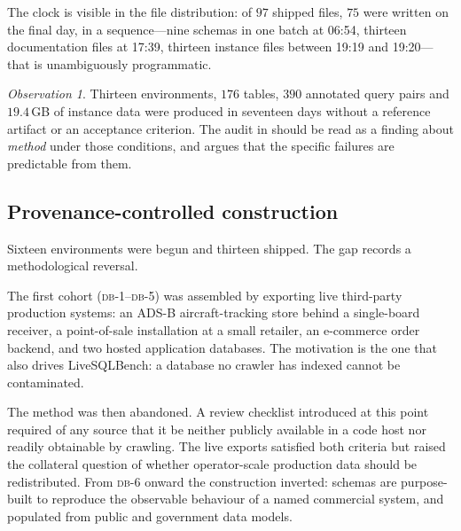 \documentclass[11pt,letterpaper]{article}
\theoremstyle{definition}
\theoremstyle{plain}
\theoremstyle{remark}
\newtheorem{observation}{Observation}
\newcommand{\dbn}[1]{\textsc{db-#1}}
\begin{document}
The clock is visible in the file distribution: of $97$ shipped files, $75$ were written on the
final day, in a sequence---nine schemas in one batch at 06:54, thirteen documentation files at
17:39, thirteen instance files between 19:19 and 19:20---that is unambiguously programmatic.

\begin{observation}
\label{obs:scale}
Thirteen environments, $176$ tables, $390$ annotated query pairs and $19.4$\,GB of instance
data were produced in seventeen days without a reference artifact or an acceptance criterion.
The audit in  should be read as a finding about \emph{method} under those
conditions, and  argues that the specific failures are predictable from
them.
\end{observation}

\subsection{Provenance-controlled construction}
\label{sec:provenance}

Sixteen environments were begun and thirteen shipped. The gap records a methodological
reversal.

The first cohort (\dbn{1}--\dbn{5}) was assembled by exporting live third-party production
systems: an ADS-B aircraft-tracking store behind a single-board receiver, a point-of-sale
installation at a small retailer, an e-commerce order backend, and two hosted application
databases. The motivation is the one that also drives LiveSQLBench: a database no crawler has
indexed cannot be contaminated.

The method was then abandoned. A review checklist introduced at this point required of any
source that it be neither publicly available in a code host nor readily obtainable by
crawling. The live exports satisfied both criteria but raised the collateral question of
whether operator-scale production data should be redistributed. From \dbn{6} onward the
construction inverted: schemas are purpose-built to reproduce the observable behaviour of a
named commercial system, and populated from public and government data models.
\end{document}
